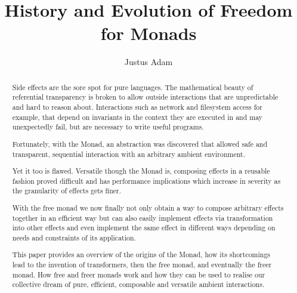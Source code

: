 \documentclass[sigconf]{acmart}
\begin{document}
\title{History and Evolution of Freedom for Monads}

\author{Justus Adam}
\affiliation{}


\begin{abstract}
Side effects are the sore spot for pure languages. The mathematical beauty of
referential transparency is broken to allow outside interactions that are
unpredictable and hard to reason about. Interactions such as network and
filesystem access for example, that depend on invariants in the context they are
executed in and may unexpectedly fail, but are necessary to write useful
programs.

Fortunately, with the Monad, an abstraction was discovered that allowed safe and
transparent, sequential interaction with an arbitrary ambient environment.

Yet it too is flawed. Versatile though the Monad is, composing effects in a
reusable fashion proved difficult and has performance implications which
increase in severity as the granularity of effects gets finer.

With the free monad we now finally not only obtain a way to compose arbitrary
effects together in an efficient way but can also easily implement effects via
transformation into other effects and even implement the same effect in
different ways depending on needs and constraints of its application.

This paper provides an overview of the origins of the Monad, how its
shortcomings lead to the invention of transformers, then the free monad, and
eventually the freer monad. How free and freer monads work and how they can be
used to realise our collective dream of pure, efficient, composable and
versatile ambient interactions.
\end{abstract}

\maketitle











\end{document}
